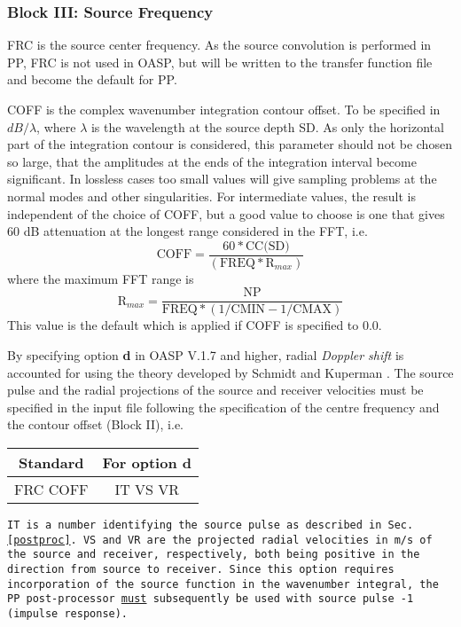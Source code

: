 \subsubsection{Block III: Source Frequency}

FRC is the source center frequency. As the source convolution is
performed in PP,  FRC is not used in OASP, but will be written to the
transfer function file and become the default for PP.

COFF is the complex wavenumber
integration 
contour offset. To be specified in
		$dB/\lambda$, where $\lambda$ is the wavelength at the source 
		depth SD. As only the horizontal part of
		the integration contour is considered, this parameter
		should not be chosen so large, that the amplitudes
		at the ends of the integration interval become 
		significant. In lossless cases too small values
		will give sampling problems at the normal modes
		and other singularities. For intermediate values,
		the result is independent of the choice of COFF,
		but a good value to choose is one that gives 60 dB
		attenuation at the longest range considered in the FFT, i.e.
                \begin{displaymath}
		\mbox{COFF} = \frac{60 \ast \mbox{CC(SD)}}{( \mbox{FREQ} \ast \mbox{R}_{max} )}
		\end{displaymath} 
       		where the maximum FFT range is
       		\begin{displaymath}
		\mbox{R}_{max} = \frac{\mbox{NP}}{\mbox{FREQ}\ast(1/\mbox{CMIN} - 1/\mbox{CMAX})}
		\end{displaymath}
		This value is the default which is applied if COFF
		is specified to 0.0.


By specifying option {\bf d} in OASP V.1.7 and higher,
radial {\em Doppler shift} is accounted for 
using the theory developed by Schmidt and Kuperman
\cite{sk:jasa94}.  The source pulse and the radial projections of the
source and  receiver velocities must be specified in the input file
following the specification of the centre frequency and the contour
offset (Block II), i.e.

\begin{tabular}{cc}
   Standard   &    For option {\bf d} \\ \hline
FRC COFF & IT VS VR
\end{tabular}


\tt IT \rm is a number identifying the source pulse as described
in Sec.\,\ref{postproc}. \tt VS \rm and \tt VR \rm are the
projected radial velocities in m/s of the source and receiver, respectively,
both being positive in the direction from source to receiver.
Since this option requires incorporation of the
source function in the wavenumber integral, the PP post-processor
\underline{must} subsequently be used with source pulse -1 (impulse response).


